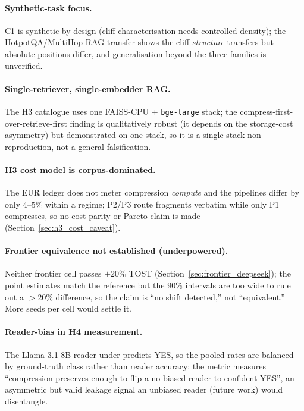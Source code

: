 \paragraph{Synthetic-task focus.}
C1 is synthetic by design (cliff characterisation needs controlled
density); the HotpotQA/MultiHop-RAG transfer shows the cliff
\emph{structure} transfers but absolute positions differ, and
generalisation beyond the three families is unverified.

\paragraph{Single-retriever, single-embedder RAG.}
The H3 catalogue uses one FAISS-CPU + \texttt{bge-large} stack; the
compress-first-over-retrieve-first finding is qualitatively robust
(it depends on the storage-cost asymmetry) but demonstrated on one
stack, so it is a single-stack non-reproduction, not a general
falsification.

\paragraph{H3 cost model is corpus-dominated.}
The EUR ledger does not meter compression \emph{compute} and the
pipelines differ by only $4$--$5\%$ within a regime; P2/P3 route
fragments verbatim while only P1 compresses, so no cost-parity or
Pareto claim is made (Section~\ref{sec:h3_cost_caveat}).

\paragraph{Frontier equivalence not established (underpowered).}
Neither frontier cell passes $\pm20\%$ TOST
(Section~\ref{sec:frontier_deepseek}); the point estimates match the
reference but the $90\%$ intervals are too wide to rule out a
$>20\%$ difference, so the claim is ``no shift detected,'' not
``equivalent.'' More seeds per cell would settle it.

\paragraph{Reader-bias in H4 measurement.}
The Llama-3.1-8B reader under-predicts YES, so the pooled rates are
balanced by ground-truth class rather than reader accuracy; the
metric measures ``compression preserves enough to flip a no-biased
reader to confident YES'', an asymmetric but valid leakage signal an
unbiased reader (future work) would disentangle.

